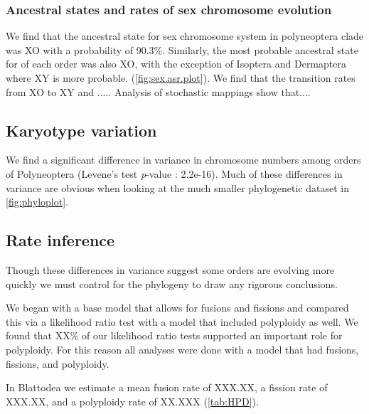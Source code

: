 

\subsubsection{Ancestral states and rates of sex chromosome evolution}

We find that the ancestral state for sex chromosome system in polyneoptera clade was XO with a probability of 90.3\%.
Similarly, the most probable ancestral state for of each order was also XO, with the exception of Isoptera and Dermaptera where XY is more probable.
(\cref{fig:sex.asr.plot}).
We find that the transition rates from XO to XY and ..... %
Analysis of stochastic mappings show that.... %

\subsection{Karyotype variation}
We find a significant difference in variance in chromosome numbers among orders of Polyneoptera (Levene's test \textit{p}-value : 2.2e-16). %
Much of these differences in variance are obvious when looking at the much smaller phylogenetic dataset in \cref{fig:phyloplot}.

\subsection{Rate inference}
Though these differences in variance suggest some orders are evolving more quickly we must control for the phylogeny to draw any rigorous conclusions.

We began with a base model that allows for fusions and fissions and compared this via a likelihood ratio test with a model that included polyploidy as well.
We found that XX\% of our likelihood ratio tests supported an important role for polyploidy.
For this reason all analyses were done with a model that had fusions, fissions, and polyploidy.

In Blattodea we estimate a mean fusion rate of XXX.XX, a fission rate of XXX.XX, and a polyploidy rate of XX.XXX (\cref{tab:HPD}).

